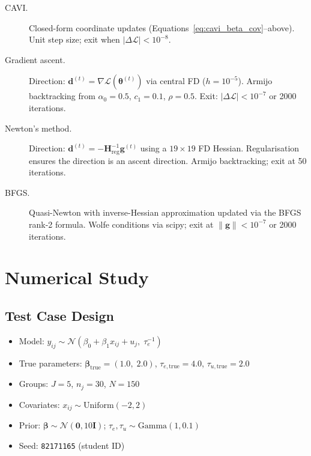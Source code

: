 \documentclass[11pt,a4paper]{article}
\newcommand{\N}{\mathcal{N}}
\begin{document}
\begin{description}
\item[CAVI.]
  Closed-form coordinate updates (Equations~\ref{eq:cavi_beta_cov}--above).
  Unit step size; exit when $|\Delta\mathcal{L}| < 10^{-8}$.

\item[Gradient ascent.]
  Direction: $\bm{d}^{(t)} = \nabla\mathcal{L}(\bm{\theta}^{(t)})$ via central FD
  ($h=10^{-5}$).
  Armijo backtracking from $\alpha_0=0.5$, $c_1=0.1$, $\rho=0.5$.
  Exit: $|\Delta\mathcal{L}| < 10^{-7}$ or 2000 iterations.

\item[Newton's method.]
  Direction: $\bm{d}^{(t)} = -\bm{H}_{\mathrm{reg}}^{-1}\bm{g}^{(t)}$ using a
  $19\times 19$ FD Hessian.
  Regularisation ensures the direction is an ascent direction.
  Armijo backtracking; exit at 50 iterations.

\item[BFGS.]
  Quasi-Newton with inverse-Hessian approximation updated via the BFGS rank-2 formula.
  Wolfe conditions via scipy; exit at $\|\bm{g}\|<10^{-7}$ or 2000 iterations.
\end{description}

\section{Numerical Study}

\subsection{Test Case Design}

\begin{itemize}
  \item Model: $y_{ij} \sim \mathcal{N}(\beta_0 + \beta_1 x_{ij} + u_j,\; \tau_e^{-1})$
  \item True parameters: $\bm{\beta}_{\mathrm{true}} = (1.0,\; 2.0)$,
    $\tau_{e,\mathrm{true}}=4.0$, $\tau_{u,\mathrm{true}}=2.0$
  \item Groups: $J=5$, $n_j=30$, $N=150$
  \item Covariates: $x_{ij} \sim \mathrm{Uniform}(-2, 2)$
  \item Prior: $\bm{\beta} \sim \N(\bm{0}, 10\bm{I})$;
    $\tau_e, \tau_u \sim \mathrm{Gamma}(1, 0.1)$
  \item Seed: \texttt{82171165} (student ID)
\end{itemize}
\end{document}
